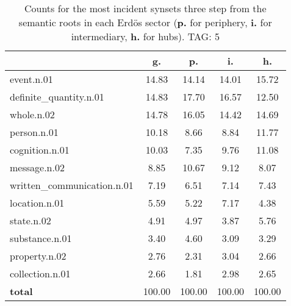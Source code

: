 \begin{table}[h!]
\begin{center}
\begin{tabular}{| l | c | c | c | c |}\hline
 & g. & p. & i. & h. \\\hline
event.n.01 & 14.83  & 14.14  & 14.01  & 15.72 \\\hline
definite\_quantity.n.01 & 14.83  & 17.70  & 16.57  & 12.50 \\\hline
whole.n.02 & 14.78  & 16.05  & 14.42  & 14.69 \\\hline
person.n.01 & 10.18  & 8.66  & 8.84  & 11.77 \\\hline
cognition.n.01 & 10.03  & 7.35  & 9.76  & 11.08 \\\hline
message.n.02 & 8.85  & 10.67  & 9.12  & 8.07 \\\hline
written\_communication.n.01 & 7.19  & 6.51  & 7.14  & 7.43 \\\hline
location.n.01 & 5.59  & 5.22  & 7.17  & 4.38 \\\hline
state.n.02 & 4.91  & 4.97  & 3.87  & 5.76 \\\hline
substance.n.01 & 3.40  & 4.60  & 3.09  & 3.29 \\\hline
property.n.02 & 2.76  & 2.31  & 3.04  & 2.66 \\\hline
collection.n.01 & 2.66  & 1.81  & 2.98  & 2.65 \\\hline
{{\bf total}} & 100.00  & 100.00  & 100.00  & 100.00 \\\hline
\end{tabular}
\caption{Counts for the most incident synsets three step from the semantic roots in each Erd\"os sector ({\bf p.} for periphery, {\bf i.} for intermediary, {\bf h.} for hubs). TAG: 5}
\end{center}
\end{table}